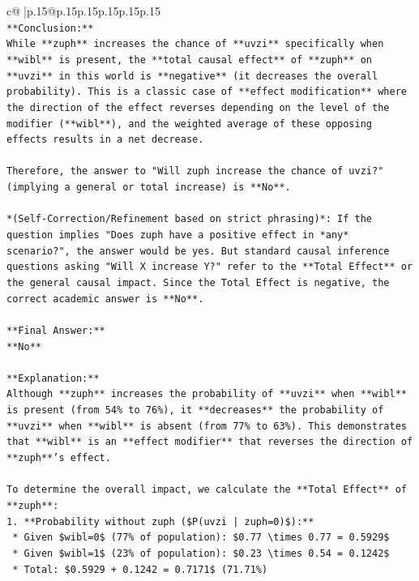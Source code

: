 \documentclass{article}
\begin{document}
{\begin{supertabular}{c@{$\;$}|p{.15\linewidth}@{}p{.15\linewidth}p{.15\linewidth}p{.15\linewidth}p{.15\linewidth}p{.15\linewidth}}
{{{\\ 
\texttt{**Conclusion:**} \\
\texttt{While **zuph** increases the chance of **uvzi** specifically when **wibl** is present, the **total causal effect** of **zuph** on **uvzi** in this world is **negative** (it decreases the overall probability). This is a classic case of **effect modification** where the direction of the effect reverses depending on the level of the modifier (**wibl**), and the weighted average of these opposing effects results in a net decrease.} \\
\\ 
\texttt{Therefore, the answer to "Will zuph increase the chance of uvzi?" (implying a general or total increase) is **No**.} \\
\\ 
\texttt{*(Self{-}Correction/Refinement based on strict phrasing)*: If the question implies "Does zuph have a positive effect in *any* scenario?", the answer would be yes. But standard causal inference questions asking "Will X increase Y?" refer to the **Total Effect** or the general causal impact. Since the Total Effect is negative, the correct academic answer is **No**.} \\
\\ 
\texttt{**Final Answer:**} \\
\texttt{**No**} \\
\\ 
\texttt{**Explanation:**} \\
\texttt{Although **zuph** increases the probability of **uvzi** when **wibl** is present (from 54\% to 76\%), it **decreases** the probability of **uvzi** when **wibl** is absent (from 77\% to 63\%). This demonstrates that **wibl** is an **effect modifier** that reverses the direction of **zuph**'s effect.} \\
\\ 
\texttt{To determine the overall impact, we calculate the **Total Effect** of **zuph**:} \\
\texttt{1.  **Probability without zuph (\$P(uvzi | zuph=0)\$):**} \\
\texttt{    *   Given \$wibl=0\$ (77\% of population): \$0.77 \textbackslash{}times 0.77 = 0.5929\$} \\
\texttt{    *   Given \$wibl=1\$ (23\% of population): \$0.23 \textbackslash{}times 0.54 = 0.1242\$} \\
\texttt{    *   Total: \$0.5929 + 0.1242 = 0.7171\$ (71.71\%)} \\
\\ 
}}}
\end{supertabular}}
\end{document}
